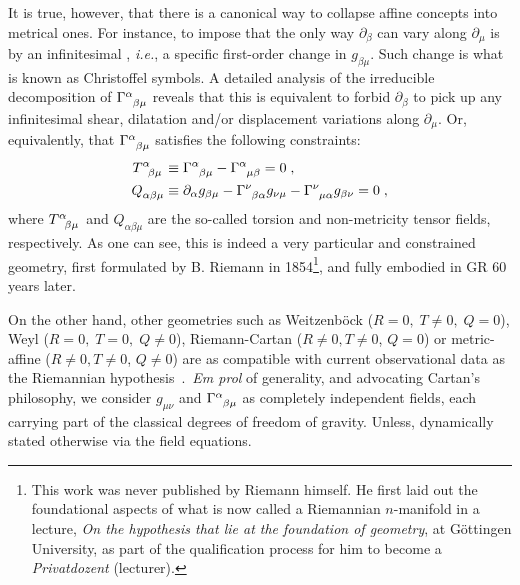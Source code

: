 \documentclass[../../main.tex]{subfiles}
\begin{document}
It is true, however, that there is a canonical way to collapse affine concepts into metrical ones. For instance, to impose that the only way $\partial_\beta$ can vary along $\partial_\mu$ is by an infinitesimal , \textit{i.e.}, a specific first-order change in $g_{\beta\mu}$. Such change is what is known as Christoffel symbols. A detailed analysis of the irreducible decomposition of $\tensor{\Gamma}{^\alpha_{\beta\mu}}$ reveals that this is equivalent to forbid $\partial_\beta$ to pick up any infinitesimal shear, dilatation and/or displacement variations along $\partial_\mu$. Or, equivalently, that $\tensor{\Gamma}{^\alpha_{\beta\mu}}$ satisfies the following constraints:
\begin{subequations}\label{eq:vanishing_torsion_nonmetricity}
  \begin{align}
    \tensor{T}{^\alpha_{\beta\mu}} & \equiv \tensor{\Gamma}{^\alpha_{\beta\mu}}-\tensor{\Gamma}{^\alpha_{\mu\beta}} = 0 \label{eq:vanishing_torsion} \;,                                                       \\
    \tensor{Q}{_{\alpha\beta\mu}}  & \equiv \partial_\alpha g_{\beta\mu} -\tensor{\Gamma}{^\nu_{\beta\alpha}}g_{\nu\mu}-\tensor{\Gamma}{^\nu_{\mu\alpha}}g_{\beta\nu} = 0 \label{eq:vanishing_nonmetricity}\;,
  \end{align}
\end{subequations}
where $\tensor{T}{^\alpha_{\beta\mu}}$ and $Q_{\alpha\beta\mu}$ are the so-called torsion and non-metricity tensor fields, respectively. As one can see, this is indeed a very particular and constrained geometry, first formulated by B. Riemann in 1854\footnote{This work was never published by Riemann himself. He first laid out the foundational aspects of what is now called a Riemannian $n$-manifold in a lecture, \textit{On the hypothesis that lie at the foundation of geometry}, at G\"{o}ttingen University, as part of the qualification process for him to become a \textit{Privatdozent} (lecturer).}, and fully embodied in GR 60 years later\@.

On the other hand, other geometries such as Weitzenb\"{o}ck ($R=0, \; T\neq 0, \; Q=0$), Weyl ($R=0, \; T=0, \; Q\neq 0$), Riemann-Cartan  ($R\neq 0, T\neq 0$, $Q=0$) or metric-affine ($R\neq 0, T\neq 0$, $Q\neq 0$) are as compatible with current observational data as the Riemannian hypothesis~\cite{hehl1974,lammerzahl1997,fay2007,capozziello2011,nojiri2011,clifton2012,obukhov2014,broderick2014,berti2015,yagi2016,baker2017,mizuno2018,sunny2019,eht2019,jimenez2019,iosifidis2020,bahamonde2021,cantata2021,lobo2021,ferreira2022,golovnev2022}.\ \textit{Em prol} of generality, and advocating Cartan's philosophy, we consider $g_{\mu\nu}$ and $\tensor{\Gamma}{^\alpha_{\beta\mu}}$ as completely independent fields, each carrying part of the classical degrees of freedom of gravity. Unless, dynamically stated otherwise via the field equations.
\end{document}
